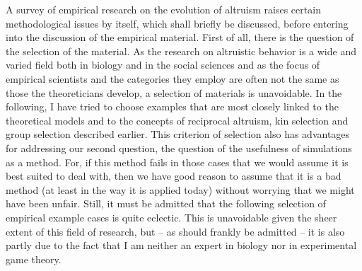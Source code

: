 A survey of empirical research on the evolution of altruism raises certain
methodological issues by itself, which shall briefly be discussed, before
entering into the discussion of the empirical material. First of all, there is
the question of the selection of the material. As the research on altruistic
behavior is a wide and varied field both in biology and in the social sciences
and as the focus of empirical scientists and the categories they employ are
often not the same as those the theoreticians develop, a selection of materials
is unavoidable. In the following, I have tried to choose examples that are most
closely linked to the theoretical models and to the concepts of reciprocal
altruism, kin selection and group selection described earlier. This criterion
of selection also has advantages for addressing our second question, the
question of the usefulness of simulations as a method. For, if this method
fails in those cases that we would assume it is best suited to deal with, then
we have good reason to assume that it is a bad method (at least in the way it
is applied today) without worrying that we might have been unfair. Still, it
must be admitted that the following selection of empirical example cases is
quite eclectic. This is unavoidable given the sheer extent of this field of
research, but -- as should frankly be admitted -- it is also partly due to the
fact that I am neither an expert in biology nor in experimental game theory.

